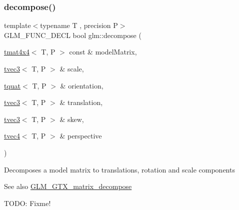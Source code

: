 \subsubsection{\texorpdfstring{decompose()}{decompose()}}
{\footnotesize\ttfamily template$<$typename T , precision P$>$ \\
G\+L\+M\+\_\+\+F\+U\+N\+C\+\_\+\+D\+E\+CL bool glm\+::decompose (\begin{DoxyParamCaption}\item[{\hyperlink{structglm_1_1tmat4x4}{tmat4x4}$<$ T, P $>$ const \&}]{model\+Matrix,  }\item[{\hyperlink{structglm_1_1tvec3}{tvec3}$<$ T, P $>$ \&}]{scale,  }\item[{\hyperlink{structglm_1_1tquat}{tquat}$<$ T, P $>$ \&}]{orientation,  }\item[{\hyperlink{structglm_1_1tvec3}{tvec3}$<$ T, P $>$ \&}]{translation,  }\item[{\hyperlink{structglm_1_1tvec3}{tvec3}$<$ T, P $>$ \&}]{skew,  }\item[{\hyperlink{structglm_1_1tvec4}{tvec4}$<$ T, P $>$ \&}]{perspective }\end{DoxyParamCaption})}

Decomposes a model matrix to translations, rotation and scale components \begin{DoxySeeAlso}{See also}
\hyperlink{group__gtx__matrix__decompose}{G\+L\+M\+\_\+\+G\+T\+X\+\_\+matrix\+\_\+decompose} 
\end{DoxySeeAlso}
T\+O\+DO\+: Fixme! 